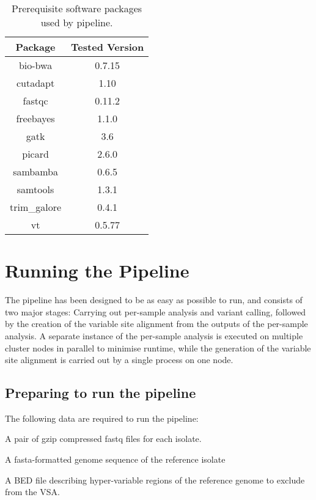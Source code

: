 \documentclass[a4paper,10pt,twoside]{article}
\newenvironment{tight_enumerate}{
\begin{enumerate}
  \setlength{\itemsep}{0pt}
  \setlength{\parskip}{0pt}
}{\end{enumerate}}
\begin{document}
\begin{table}
{\scriptsize
\begin{tabularx}{100pt}{@{}cc@{}}\toprule
Package	& Tested Version \\\midrule
bio-bwa		&	0.7.15 \\
cutadapt	&	1.10 \\
fastqc		&	0.11.2 \\
freebayes	&	1.1.0 \\
gatk		&	3.6 \\
picard		&	2.6.0 \\
sambamba	&	0.6.5 \\
samtools	&	1.3.1 \\
trim\_galore	&	0.4.1 \\
vt	&	0.5.77 \\\hline
\end{tabularx}}{}
\caption{Prerequisite software packages used by pipeline.\label{tab:01}} 
\end{table}

\section {Running the Pipeline}

The pipeline has been designed to be as easy as possible to run, and consists
of two major stages: Carrying out per-sample analysis and variant calling,
followed by the creation of the variable site alignment from the outputs of the
per-sample analysis. A separate instance of the per-sample analysis is executed
on multiple cluster nodes in parallel to minimise runtime, while the generation
of the variable site alignment is carried out by a single process on one node.

\subsection {Preparing to run the pipeline}

The following data are required to run the pipeline:

\begin{tight_enumerate}
\item A pair of gzip compressed fastq files for each isolate. 
\item A fasta-formatted genome sequence of the reference isolate
\item A BED file describing hyper-variable regions of the reference genome to exclude from the VSA.
\end{tight_enumerate}
\end{document}
